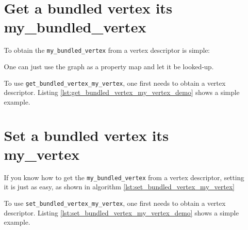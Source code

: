 

\section{Get a bundled vertex its my\_bundled\_vertex}
\label{subsec:get_bundled_vertex_my_vertex}

To obtain the \verb;my_bundled_vertex; from a vertex descriptor is simple:



One can just use the graph as a property map and let it be looked-up.

To use \verb;get_bundled_vertex_my_vertex;, 
one first needs to obtain a vertex descriptor.
Listing \ref{lst:get_bundled_vertex_my_vertex_demo}
shows a simple example.



\section{Set a bundled vertex its my\_vertex}
\label{subsec:set_bundled_vertex_my_vertex}

If you know how to get the \verb;my_bundled_vertex; from a vertex descriptor,
setting it is just as easy, 
as shown in algorithm \ref{lst:set_bundled_vertex_my_vertex}



To use \verb;set_bundled_vertex_my_vertex;, 
one first needs to obtain a vertex descriptor.
Listing \ref{lst:set_bundled_vertex_my_vertex_demo}
shows a simple example.




